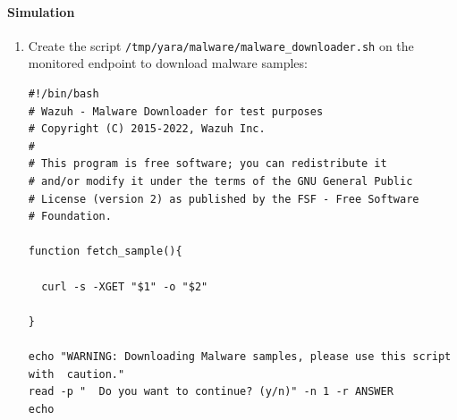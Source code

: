 \paragraph{Simulation}
\begin{enumerate}
    \item Create the script \texttt{/tmp/yara/malware/malware\_downloader.sh} on the monitored endpoint to download malware samples:
    \begin{verbatim}
#!/bin/bash
# Wazuh - Malware Downloader for test purposes
# Copyright (C) 2015-2022, Wazuh Inc.
#
# This program is free software; you can redistribute it
# and/or modify it under the terms of the GNU General Public
# License (version 2) as published by the FSF - Free Software
# Foundation.

function fetch_sample(){

  curl -s -XGET "$1" -o "$2"

}

echo "WARNING: Downloading Malware samples, please use this script with  caution."
read -p "  Do you want to continue? (y/n)" -n 1 -r ANSWER
echo


\end{verbatim}
\end{enumerate}
